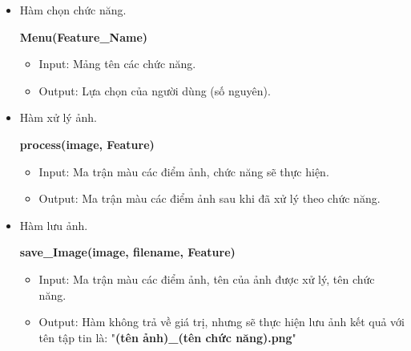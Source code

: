 \documentclass{report}
\begin{document}
\begin{itemize}
    \item Hàm chọn chức năng.
    \begin{center}
        \textbf{Menu(Feature\_Name)}
    \end{center}
        \begin{itemize}
            \item Input: Mảng tên các chức năng.
            \item Output: Lựa chọn của người dùng (số nguyên).
        \end{itemize}

   \item Hàm xử lý ảnh.
   \begin{center}
       \textbf{process(image, Feature)}
   \end{center}
        \begin{itemize}
            \item Input: Ma trận màu các điểm ảnh, chức năng sẽ thực hiện.
            \item Output: Ma trận màu các điểm ảnh sau khi đã xử lý theo chức năng.
        \end{itemize}

    \item Hàm lưu ảnh.
    \begin{center}
        \textbf{save\_Image(image, filename, Feature)}
    \end{center}
        \begin{itemize}
            \item Input: Ma trận màu các điểm ảnh, tên của ảnh được xử lý, tên chức năng.
            \item Output: Hàm không trả về giá trị, nhưng sẽ thực hiện lưu ảnh kết quả với tên tập tin là: "\textbf{(tên ảnh)\_(tên chức năng).png}"
        \end{itemize}
\end{itemize}
\end{document}
